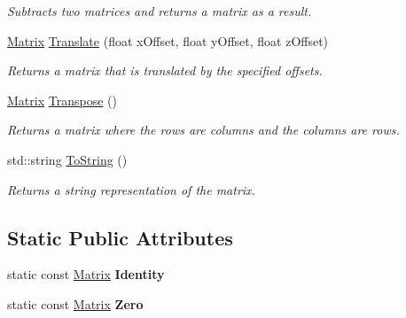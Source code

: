 \begin{DoxyCompactItemize}
\begin{DoxyCompactList}\small\item\em Subtracts two matrices and returns a matrix as a result. \end{DoxyCompactList}\item 
\hypertarget{struct_jade_1_1_math_1_1_matrix_aa1a013157118a87cd242d25e668aa3b6}{}\hyperlink{struct_jade_1_1_math_1_1_matrix}{Matrix} \hyperlink{struct_jade_1_1_math_1_1_matrix_aa1a013157118a87cd242d25e668aa3b6}{Translate} (float x\+Offset, float y\+Offset, float z\+Offset)\label{struct_jade_1_1_math_1_1_matrix_aa1a013157118a87cd242d25e668aa3b6}

\begin{DoxyCompactList}\small\item\em Returns a matrix that is translated by the specified offsets. \end{DoxyCompactList}\item 
\hypertarget{struct_jade_1_1_math_1_1_matrix_ac235e6add4163f779f1a3b007ee0f6d7}{}\hyperlink{struct_jade_1_1_math_1_1_matrix}{Matrix} \hyperlink{struct_jade_1_1_math_1_1_matrix_ac235e6add4163f779f1a3b007ee0f6d7}{Transpose} ()\label{struct_jade_1_1_math_1_1_matrix_ac235e6add4163f779f1a3b007ee0f6d7}

\begin{DoxyCompactList}\small\item\em Returns a matrix where the rows are columns and the columns are rows. \end{DoxyCompactList}\item 
\hypertarget{struct_jade_1_1_math_1_1_matrix_a913cad2a5906c10e1547ca26a1c3f18d}{}std\+::string \hyperlink{struct_jade_1_1_math_1_1_matrix_a913cad2a5906c10e1547ca26a1c3f18d}{To\+String} ()\label{struct_jade_1_1_math_1_1_matrix_a913cad2a5906c10e1547ca26a1c3f18d}

\begin{DoxyCompactList}\small\item\em Returns a string representation of the matrix. \end{DoxyCompactList}\end{DoxyCompactItemize}
\subsection*{Static Public Attributes}
\begin{DoxyCompactItemize}
\item 
\hypertarget{struct_jade_1_1_math_1_1_matrix_a89bfcd378ee8aeba30f393a9bc431e49}{}static const \hyperlink{struct_jade_1_1_math_1_1_matrix}{Matrix} {\bfseries Identity}\label{struct_jade_1_1_math_1_1_matrix_a89bfcd378ee8aeba30f393a9bc431e49}

\item 
\hypertarget{struct_jade_1_1_math_1_1_matrix_a32ed6952707144091d2bee00c0af4cc4}{}static const \hyperlink{struct_jade_1_1_math_1_1_matrix}{Matrix} {\bfseries Zero}\label{struct_jade_1_1_math_1_1_matrix_a32ed6952707144091d2bee00c0af4cc4}

\end{DoxyCompactItemize}



